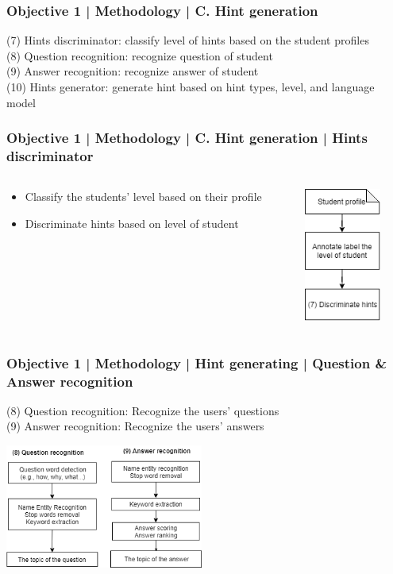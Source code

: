 \documentclass{beamer}
\begin{document}
\begin{frame}
\frametitle{Objective 1 | Methodology | C. Hint generation}
(7) Hints discriminator: classify level of hints based on the student profiles \\
(8) Question recognition: recognize question of student\\
(9) Answer recognition: recognize answer of student \\

(10) Hints generator: generate hint based on hint types, level, and language model \\
\end{frame}


\begin{frame}
\frametitle{Objective 1 | Methodology | C. Hint generation | Hints discriminator }
\begin{columns}
	
	\begin{column}{.55\textwidth}
		\begin{itemize}
			\item Classify the students' level based on their profile
			\item Discriminate hints based on level of student
			
		\end{itemize}
		
	\end{column}
	\begin{column}{.55\textwidth}
		\includegraphics[width=25mm]{hd1.png}
	\end{column}
\end{columns}
\end{frame}
\begin{frame}
\frametitle{Objective 1 | Methodology | Hint generating | Question \& Answer recognition }
(8) Question recognition: Recognize the users' questions\\
(9) Answer recognition: Recognize the users' answers
\begin{center}
		\includegraphics[width=65mm]{qa3.png}
\end{center}
\end{frame}
	
\end{document}
